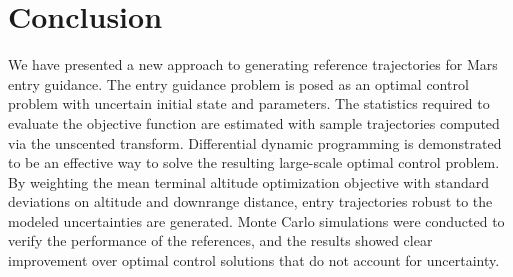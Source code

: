 \documentclass[journal ]{new-aiaa}
\begin{document}
\section*{Conclusion}
We have presented a new approach to generating reference trajectories for Mars entry guidance. The entry guidance problem is posed as an optimal control problem with uncertain initial state and parameters. The statistics required to evaluate the objective function are estimated with sample trajectories computed via the unscented transform. Differential dynamic programming is demonstrated to be an effective way to solve the resulting large-scale optimal control problem. By weighting the mean terminal altitude optimization objective with standard deviations on altitude and downrange distance, entry trajectories robust to the modeled uncertainties are generated. Monte Carlo simulations were conducted to verify the performance of the references, and the results showed clear improvement over optimal control solutions that do not account for uncertainty. 

\end{document}
